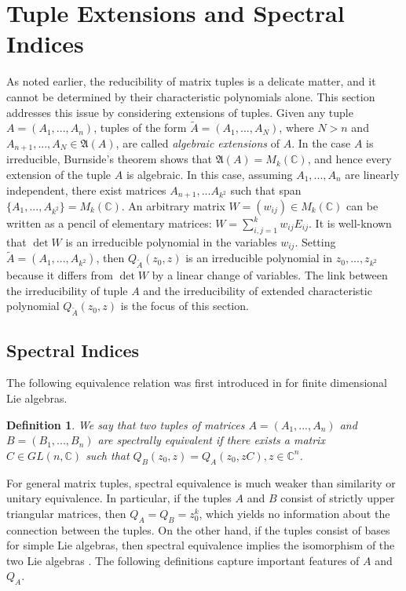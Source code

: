 \documentclass[draft, 12pt, reqno]{amsart}
\newcommand{\C}{{\mathbb C}}
\numberwithin{equation}{section}
\theoremstyle{plain}
\newtheorem{definition}[theorem]{Definition}
\begin{document}
 
\section{Tuple Extensions and Spectral Indices}\label{exten}

As noted earlier, the reducibility of matrix tuples is a delicate matter, and it cannot be determined by their characteristic polynomials alone. This section addresses this issue by considering extensions of tuples. Given any tuple $A=(A_1, ..., A_n)$, tuples of the form $\widetilde{A}=(A_1, ..., A_N)$, where $N>n$ and $A_{n+1}, ..., A_N\in \mathfrak{A}(A)$, are called {\em algebraic extensions} of $A$. In the case $A$ is irreducible, Burnside's theorem shows that $\mathfrak{A}(A)=M_k(\C)$, and hence every extension of the tuple $A$ is algebraic. In this case, assuming $A_1, ..., A_n$ are linearly independent, there exist matrices $A_{n+1}, ... A_{k^2}$ such that 
span$\{A_1, ..., A_{k^2}\}=M_k(\C)$. An arbitrary matrix $W=(w_{ij})\in M_k(\C)$ can be written as a pencil of elementary matrices: $W=\sum_{i,j=1}^kw_{ij}E_{ij}$. It is well-known that $\det W$ is an irreducible polynomial in the variables $w_{ij}$. Setting $\widetilde{A}=(A_1, ..., A_{k^2})$, then $Q_{\widetilde{A}}(z_0,z)$ is an irreducible polynomial in $z_0, ..., z_{k^2}$ because it differs from $\det W$ by a linear change of variables. The link between the irreducibility of tuple $A$ and the irreducibility of extended characteristic polynomial $Q_{\widetilde{A}}(z_0,z)$ is the focus of this section.

\subsection{Spectral Indices}

The following equivalence relation was first introduced in \cite{AY} for finite dimensional Lie algebras.

\begin{definition}
    We say that two tuples of matrices $A=(A_1, ..., A_n)$ and $B=(B_1, ..., B_n)$ are {\em spectrally equivalent} if there exists a matrix $C\in GL(n,\C)$ such that $Q_{B}(z_0,z)=Q_A(z_0, zC), z\in \C^n$.
\end{definition}

For general matrix tuples, spectral equivalence is much weaker than similarity or unitary equivalence. In particular, if the tuples $A$ and $B$  consist of strictly upper triangular matrices, then $Q_A=Q_B=z_0^k$, which yields no information about the connection between the tuples. On the other hand, if the tuples consist of bases for simple Lie algebras, then spectral equivalence implies the isomorphism of the two Lie algebras \cite{FLW,GLW,Ya24}. The following definitions capture important features of $A$ and $Q_A$.
\end{document}
